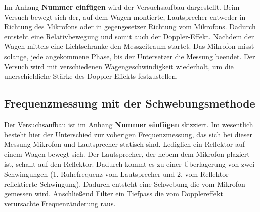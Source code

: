 Im Anhang \textbf{Nummer einfügen} wird der Versuchsaufbau dargestellt.
Beim Versuch bewegt sich der, auf dem Wagen montierte, Lautsprecher entweder
in Richtung des Mikrofons oder in gegengesetzer Richtung vom Mikrofons.
Dadurch entsteht eine Relativbewegung und somit auch der
Doppler-Effekt.
Nachdem der Wagen mittels eine Lichtschranke den Messzeitraum startet.
Das Mikrofon misst solange, jede angekommene Phase, bis der Untersetzer
die Messung beendet.
Der Versuch wird mit verschiedenen Wagengeschwindigkeit
wiederholt, um die unerschieldiche Stärke des Doppler-Effekts
festzustellen.

\subsection{Frequenzmessung mit der Schwebungsmethode}

Der Versuchsaufbau ist im Anhang \textbf{Nummer einfügen}
skizziert.
Im wesentlich besteht hier der Unterschied zur voherigen
Frequenzmessung, das sich bei dieser Messung Mikrofon und
Lautsprecher statisch sind.
Lediglich ein Reflektor auf einem Wagen bewegt sich.
Der Lautsprecher, der nebem dem Mikrofon plaziert ist, schallt auf
den Reflektor. Dadurch kommt es zu einer Überlagerung von zwei Schwingungen
(1. Ruhefrequenz vom Lautsprecher und 2. vom Reflektor reflektierte Schwingung).
Dadurch entsteht eine Schwebung die vom Mikrofon gemessen wird.
Anschließend Filter ein Tiefpass die vom Dopplereffekt verursachte
Frequenzänderung raus.
